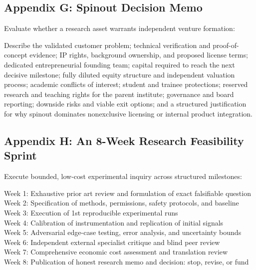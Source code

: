 \subsection{Appendix G: Spinout Decision Memo}

Evaluate whether a research asset warrants independent venture formation:

\begin{tcolorbox}[colback=BayesCanvas,colframe=BayesDark,arc=1mm,title=\textbf{Appendix G: Spinout Decision Evaluation Memo}]
\scriptsize
Describe the validated customer problem; technical verification and proof-of-concept evidence; IP rights, background ownership, and proposed license terms; dedicated entrepreneurial founding team; capital required to reach the next decisive milestone; fully diluted equity structure and independent valuation process; academic conflicts of interest; student and trainee protections; reserved research and teaching rights for the parent institute; governance and board reporting; downside risks and viable exit options; and a structured justification for why spinout dominates nonexclusive licensing or internal product integration.
\end{tcolorbox}

\subsection{Appendix H: An 8-Week Research Feasibility Sprint}

Execute bounded, low-cost experimental inquiry across structured milestones:

\begin{tcolorbox}[colback=BayesCanvas,colframe=BayesDark,arc=1mm,title=\textbf{Appendix H: An 8-Week Research Feasibility Sprint Architecture}]
\scriptsize\ttfamily
Week 1: Exhaustive prior art review and formulation of exact falsifiable question\\
Week 2: Specification of methods, permissions, safety protocols, and baseline\\
Week 3: Execution of 1st reproducible experimental runs\\
Week 4: Calibration of instrumentation and replication of initial signals\\
Week 5: Adversarial edge-case testing, error analysis, and uncertainty bounds\\
Week 6: Independent external specialist critique and blind peer review\\
Week 7: Comprehensive economic cost assessment and translation review\\
Week 8: Publication of honest research memo and decision: stop, revise, or fund
\end{tcolorbox}

